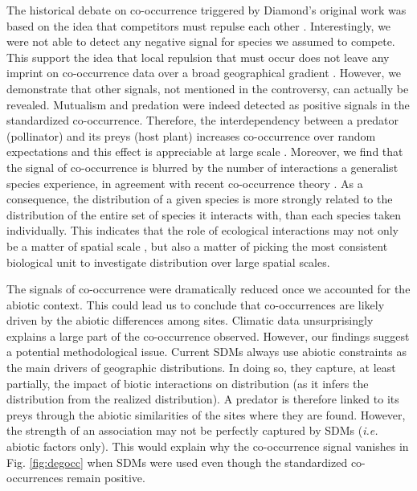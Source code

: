 The historical debate on co-occurrence triggered by Diamond's original
work was based on the idea that competitors must repulse each other
\citep{Diamond1975}. Interestingly, we were not able to detect any
negative signal for species we assumed to compete. This support the idea
that local repulsion that must occur does not leave any imprint on
co-occurrence data over a broad geographical gradient
\citep{Araujo2014}. However, we demonstrate that other signals, not
mentioned in the controversy, can actually be revealed. Mutualism and
predation were indeed detected as positive signals in the standardized
co-occurrence. Therefore, the interdependency between a predator
(pollinator) and its preys (host plant) increases co-occurrence over
random expectations and this effect is appreciable at large scale
\citep{Araujo2014}. Moreover, we find that the signal of co-occurrence
is blurred by the number of interactions a generalist species
experience, in agreement with recent co-occurrence theory
\citep{Cazelles2016}. As a consequence, the distribution of a given
species is more strongly related to the distribution of the entire set
of species it interacts with, than each species taken individually. This
indicates that the role of ecological interactions may not only be a
matter of spatial scale \citep{McGill2010}, but also a matter of picking
the most consistent biological unit to investigate distribution over
large spatial scales.

The signals of co-occurrence were dramatically reduced once we accounted
for the abiotic context. This could lead us to conclude that
co-occurrences are likely driven by the abiotic differences among sites.
Climatic data unsurprisingly explains a large part of the co-occurrence
observed. However, our findings suggest a potential methodological
issue. Current SDMs always use abiotic constraints as the main drivers
of geographic distributions. In doing so, they capture, at least
partially, the impact of biotic interactions on distribution (as it
infers the distribution from the realized distribution). A predator is
therefore linked to its preys through the abiotic similarities of the
sites where they are found. However, the strength of an association may
not be perfectly captured by SDMs (\emph{i.e.} abiotic factors only).
This would explain why the co-occurrence signal vanishes in Fig.
\ref{fig:degocc} when SDMs were used even though the standardized
co-occurrences remain positive.

